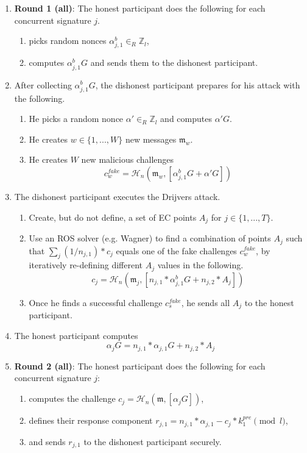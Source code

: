 \begin{enumerate}
    \item \textbf{Round 1 (all)}: The honest participant does the following for each concurrent signature $j$.
    \begin{enumerate}
        \item picks random nonces $\alpha^b_{j,1} \in_R \mathbb{Z}_l$,
        \item computes $\alpha^b_{j,1} G$ and sends them to the dishonest participant.
    \end{enumerate}

    \item After collecting $\alpha^b_{j,1} G$, the dishonest participant prepares for his attack with the following.
    \begin{enumerate}
        \item He picks a random nonce $\alpha' \in_R \mathbb{Z}_l$ and computes $\alpha' G$.
        \item He creates $w \in \{1,...,W\}$ new messages $\mathfrak{m}_w$.
        \item He creates $W$ new malicious challenges
        \[ c^{fake}_w = \mathcal{H}_n(\mathfrak{m}_w,[\alpha^b_{j,1} G + \alpha' G]) \]
    \end{enumerate}

    \item The dishonest participant executes the Drijvers attack.
    \begin{enumerate}
        \item Create, but do not define, a set of EC points $A_j$ for $j \in \{1,...,T\}$.
        \item Use an ROS solver (e.g. Wagner) to find a combination of points $A_j$ such that $\sum_j (1/n_{j,1})*c_j$ equals one of the fake challenges $c^{fake}_w$, by iteratively re-defining different $A_j$ values in the following.
        \[ c_j = \mathcal{H}_n(\mathfrak{m}_j,[n_{j,1}*\alpha^b_{j,1} G + n_{j,2}*A_j]) \]
        \item Once he finds a successful challenge $c^{fake}_{s}$, he sends all $A_j$ to the honest participant.
    \end{enumerate}

    \item The honest participant computes
    \[ \alpha_j G = n_{j,1}*\alpha_{j,1} G + n_{j,2}*A_j \]

    \item \textbf{Round 2 (all)}: The honest participant does the following for each concurrent signature $j$:
    \begin{enumerate}
        \item computes the challenge $c_j = \mathcal{H}_n(\mathfrak{m},[\alpha_j G])$,
        \item defines their response component $r_{j,1} = n_{j,1}*\alpha_{j,1} - c_j*k^{pre}_1 \pmod l$,
        \item and sends $r_{j,1}$ to the dishonest participant securely.
    \end{enumerate}


\end{enumerate}
